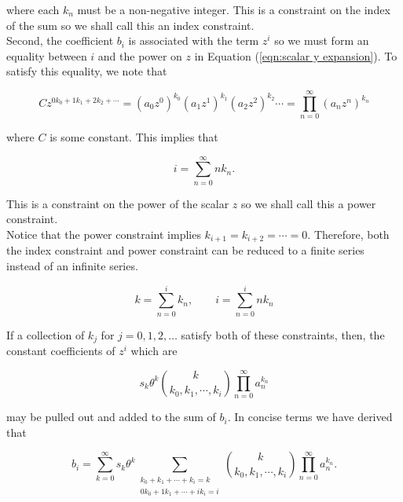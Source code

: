 where each $k_n$ must be a non-negative integer. This is a constraint on the index of the sum so we shall call this an index constraint.\\

Second, the coefficient $b_i$ is associated with the term $z^i$ so we must form an equality between $i$ and the power on $z$ in Equation (\ref{eqn:scalar y expansion}). To satisfy this equality, we note that

\begin{equation}
	C z^{0 k_0 + 1 k_1 + 2 k_2 + \cdots} = (a_0 z^0)^{k_0} (a_1 z^1)^{k_1} (a_2 z^2)^{k_2} \cdots = \prod_{n=0}^{\infty} (a_n z^n)^{k_n}
\end{equation}

where $C$ is some constant. This implies that

\begin{equation}
    i = \sum_{n=0}^{\infty} n k_n.
\end{equation}

This is a constraint on the power of the scalar $z$ so we shall call this a power constraint.\\

Notice that the power constraint implies $k_{i + 1} = k_{i + 2} = \cdots = 0$. Therefore, both the index constraint and power constraint can be reduced to a finite series instead of an infinite series.

\begin{equation}
	k = \sum_{n=0}^{i} k_n, \qquad i = \sum_{n=0}^{i} n k_n
\end{equation}

If a collection of $k_j$ for $j = 0, 1, 2, \ldots$ satisfy both of these constraints, then, the constant coefficients of $z^i$ which are

\begin{equation*}
    s_k \theta^k \binom{k}{k_0, k_1, \cdots, k_i} \prod_{n=0}^{\infty} a_n^{k_n}
\end{equation*}

may be pulled out and added to the sum of $b_i$. In concise terms we have derived that

\begin{equation}
    b_i = \sum_{k=0}^{\infty} s_k \theta^k \sum_{\substack{k_0 + k_1 + \cdots + k_i = k \\ 0 k_0 + 1 k_1 + \cdots + i k_i = i}} \binom{k}{k_0, k_1, \cdots, k_i} \prod_{n=0}^{\infty} a_n^{k_n}.
	\label{eqn:scalar power series result}
\end{equation}

